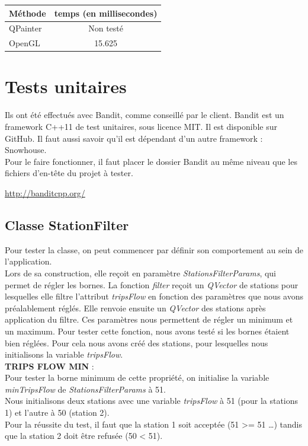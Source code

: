 \documentclass[12pt]{article}
\begin{document}
		\begin{center}
			\begin{tabular}{| l | c |}
			\hline
			\textbf{Méthode} & \textbf{temps (en millisecondes)} \\ \hline
			QPainter & Non testé\\ \hline
			OpenGL & 15.625 \\ \hline
		    \end{tabular}
	    \end{center}
		
	\newpage
	\section{Tests unitaires}
	Ils ont été effectués avec Bandit, comme conseillé par le client.
	Bandit est un framework C++11 de test unitaires, sous licence MIT. Il est disponible sur GitHub. 		Il faut aussi savoir qu’il est dépendant d’un autre framework : Snowhouse.\\

	Pour le faire fonctionner, il faut placer le dossier Bandit au même niveau que les fichiers d’en-tête du projet à tester.

	\url{http://banditcpp.org/}
	
		\subsection{Classe StationFilter}
		Pour tester la classe, on peut commencer par définir son comportement au sein de l’application.\\

		Lors de sa construction, elle reçoit en paramètre \textit{StationsFilterParams}, qui permet de régler les bornes. La fonction \textit{filter} reçoit un \textit{QVector} de stations pour lesquelles elle filtre l’attribut \textit{tripsFlow} en fonction des paramètres que nous avons préalablement réglés. Elle renvoie ensuite un \textit{QVector} des stations après application du filtre. Ces paramètres nous permettent de régler un minimum et un maximum. Pour tester cette fonction, nous avons testé si les bornes étaient bien réglées. Pour cela nous avons créé des stations, pour lesquelles nous initialisons la variable \textit{tripsFlow}.\\

		\textbf{TRIPS FLOW MIN} :\\
		Pour tester la borne minimum de cette propriété, on initialise la variable \textit{minTripsFlow} de \textit{StationsFilterParams} à 51.\\
		Nous initialisons deux stations avec une variable \textit{tripsFlow} à 51 (pour la stations 1) et l’autre à 50 (station 2).\\
		Pour la réussite du test, il faut que la station 1 soit acceptée (51 >= 51 …) tandis que la station 2 doit être refusée (50 < 51).\\
\end{document}
